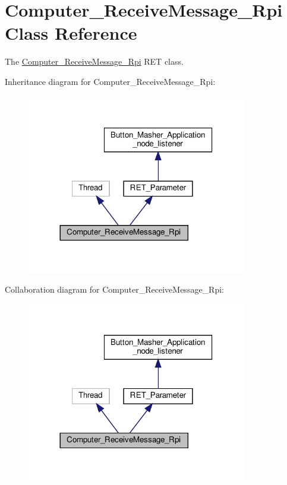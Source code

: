 \hypertarget{classRET__socket_1_1Computer__ReceiveMessage__Rpi}{}\section{Computer\+\_\+\+Receive\+Message\+\_\+\+Rpi Class Reference}
\label{classRET__socket_1_1Computer__ReceiveMessage__Rpi}


The \hyperlink{classRET__socket_1_1Computer__ReceiveMessage__Rpi}{Computer\+\_\+\+Receive\+Message\+\_\+\+Rpi} R\+ET class.  




Inheritance diagram for Computer\+\_\+\+Receive\+Message\+\_\+\+Rpi\+:
\nopagebreak
\begin{figure}[H]
\begin{center}
\leavevmode
\includegraphics[width=272pt]{classRET__socket_1_1Computer__ReceiveMessage__Rpi__inherit__graph}
\end{center}
\end{figure}


Collaboration diagram for Computer\+\_\+\+Receive\+Message\+\_\+\+Rpi\+:
\nopagebreak
\begin{figure}[H]
\begin{center}
\leavevmode
\includegraphics[width=272pt]{classRET__socket_1_1Computer__ReceiveMessage__Rpi__coll__graph}
\end{center}
\end{figure}
